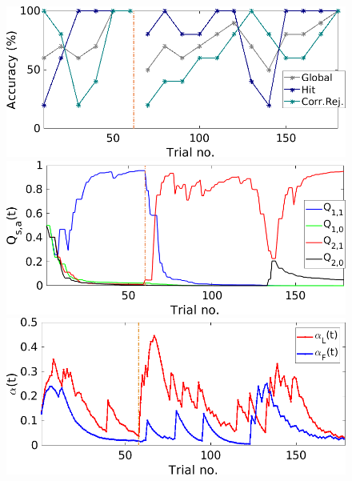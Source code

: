 \begin{figure}
    \centering
    \includegraphics[scale=0.45]{figures/PerfEndrevAn1.png}
    
    \vspace{0.5cm}
    
    \includegraphics[scale=0.45]{figures/QValuesEndrevAn1.png}
    
    \vspace{0.5cm}
    
    \includegraphics[scale=0.45]{figures/AlphaEndrevAn1.png}
    
    \vspace{0.5cm}
    

\end{figure}
